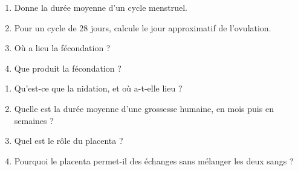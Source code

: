 \begin{enumerate}[label=\arabic*)]
\item Donne la durée moyenne d'un cycle menstruel.
\item Pour un cycle de $28$ jours, calcule le jour approximatif de l'ovulation.
\item Où a lieu la fécondation ?
\item Que produit la fécondation ?
\end{enumerate}

\sujetbac[La grossesse]
\begin{enumerate}[label=\arabic*)]
\item Qu'est-ce que la nidation, et où a-t-elle lieu ?
\item Quelle est la durée moyenne d'une grossesse humaine, en mois puis en semaines ?
\item Quel est le rôle du placenta ?
\item Pourquoi le placenta permet-il des échanges sans mélanger les deux sangs ?
\end{enumerate}

